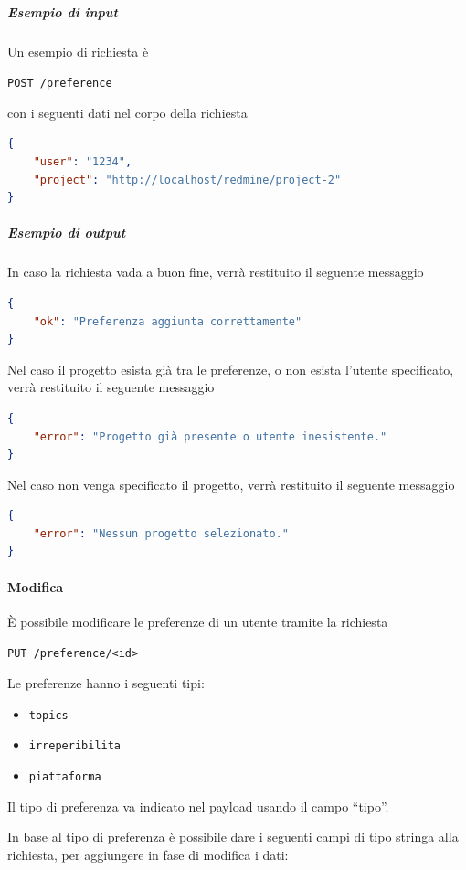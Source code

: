     \subparagraph{Esempio di input}
    Un esempio di richiesta è
        \begin{center}
            \texttt{POST  /preference}
        \end{center}
    con i seguenti dati nel corpo della richiesta
    \begin{lstlisting}[language = json]
{
    "user": "1234",
    "project": "http://localhost/redmine/project-2"
}
    \end{lstlisting}


    \subparagraph{Esempio di output}
    In caso la richiesta vada a buon fine, verrà restituito il seguente messaggio
    \begin{lstlisting}[language = json]
{
    "ok": "Preferenza aggiunta correttamente"
}
    \end{lstlisting}

    Nel caso il progetto esista già tra le preferenze, o non esista l'utente specificato, verrà restituito il seguente messaggio
    \begin{lstlisting}[language = json]
{
    "error": "Progetto già presente o utente inesistente."
}
    \end{lstlisting}

    Nel caso non venga specificato il progetto, verrà restituito il seguente messaggio
    \begin{lstlisting}[language = json]
{
    "error": "Nessun progetto selezionato."
}
    \end{lstlisting}


\paragraph{Modifica}

È possibile modificare le preferenze di un utente tramite la richiesta
\begin{center}
    \texttt{PUT /preference/<id>}
\end{center}

Le preferenze hanno i seguenti tipi:
\begin{itemize}[noitemsep]
    \item \texttt{topics}
    \item \texttt{irreperibilita}
    \item \texttt{piattaforma}
\end{itemize}

Il tipo di preferenza va indicato nel payload usando il campo ``tipo''.

In base al tipo di preferenza è possibile dare i seguenti campi di tipo stringa alla richiesta, per aggiungere in fase di modifica i dati:

